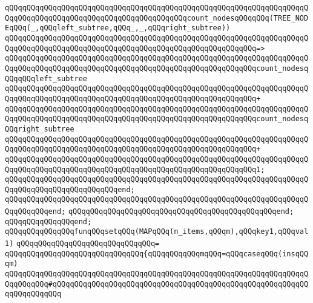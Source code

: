 \verb|qQQqqQQqqQQqqQQqqQQqqQQqqQQqqQQqqQQqqQQqqQQqqQQqqQQqqQQqqQQqqQQqqQQqqQQqqQQqqQQqqQQqqQQqqQQqqQQqqQQqqQQqqQQqqQQqcount_nodesqQQqqQQq(TREE_NODEqQQq(_,qQQqleft_subtree,qQQq_,_,qQQqright_subtree))|\newline
\verb|qQQqqQQqqQQqqQQqqQQqqQQqqQQqqQQqqQQqqQQqqQQqqQQqqQQqqQQqqQQqqQQqqQQqqQQqqQQqqQQqqQQqqQQqqQQqqQQqqQQqqQQqqQQqqQQqqQQqqQQqqQQqqQQq=>|\newline
\verb|qQQqqQQqqQQqqQQqqQQqqQQqqQQqqQQqqQQqqQQqqQQqqQQqqQQqqQQqqQQqqQQqqQQqqQQqqQQqqQQqqQQqqQQqqQQqqQQqqQQqqQQqqQQqqQQqqQQqqQQqqQQqqQQqcount_nodesqQQqqQQqleft_subtree|\newline
\verb|qQQqqQQqqQQqqQQqqQQqqQQqqQQqqQQqqQQqqQQqqQQqqQQqqQQqqQQqqQQqqQQqqQQqqQQqqQQqqQQqqQQqqQQqqQQqqQQqqQQqqQQqqQQqqQQqqQQqqQQqqQQqqQQq+|\newline
\verb|qQQqqQQqqQQqqQQqqQQqqQQqqQQqqQQqqQQqqQQqqQQqqQQqqQQqqQQqqQQqqQQqqQQqqQQqqQQqqQQqqQQqqQQqqQQqqQQqqQQqqQQqqQQqqQQqqQQqqQQqqQQqqQQqcount_nodesqQQqright_subtree|\newline
\verb|qQQqqQQqqQQqqQQqqQQqqQQqqQQqqQQqqQQqqQQqqQQqqQQqqQQqqQQqqQQqqQQqqQQqqQQqqQQqqQQqqQQqqQQqqQQqqQQqqQQqqQQqqQQqqQQqqQQqqQQqqQQqqQQq+|\newline
\verb|qQQqqQQqqQQqqQQqqQQqqQQqqQQqqQQqqQQqqQQqqQQqqQQqqQQqqQQqqQQqqQQqqQQqqQQqqQQqqQQqqQQqqQQqqQQqqQQqqQQqqQQqqQQqqQQqqQQqqQQqqQQqqQQq1;|\newline
\verb|qQQqqQQqqQQqqQQqqQQqqQQqqQQqqQQqqQQqqQQqqQQqqQQqqQQqqQQqqQQqqQQqqQQqqQQqqQQqqQQqqQQqqQQqqQQqqQQqend;|\newline
\verb|qQQqqQQqqQQqqQQqqQQqqQQqqQQqqQQqqQQqqQQqqQQqqQQqqQQqqQQqqQQqqQQqqQQqqQQqqQQqqQQqend;|\newline
\newline
\verb|qQQqqQQqqQQqqQQqqQQqqQQqqQQqqQQqqQQqqQQqqQQqqQQqend;|\newline
\verb|qQQqqQQqqQQqqQQqend;|\newline
\newline
\newline
\newline
\verb|qQQqqQQqqQQqqQQqfunqQQqsetqQQq(MAPqQQq(n_items,qQQqm),qQQqkey1,qQQqval1)|\newline
\verb|qQQqqQQqqQQqqQQqqQQqqQQqqQQqqQQq=|\newline
\verb|qQQqqQQqqQQqqQQqqQQqqQQqqQQqqQQq{qQQqqQQqqQQqmqQQq=qQQqcaseqQQq(insqQQqm)|\newline
\verb|qQQqqQQqqQQqqQQqqQQqqQQqqQQqqQQqqQQqqQQqqQQqqQQqqQQqqQQqqQQqqQQqqQQqqQQqqQQqqQQq#qQQqqQQqqQQqqQQqqQQqqQQqqQQqqQQqqQQqqQQqqQQqqQQqqQQqqQQqqQQqqQQqqQQqqQQq|\newline
